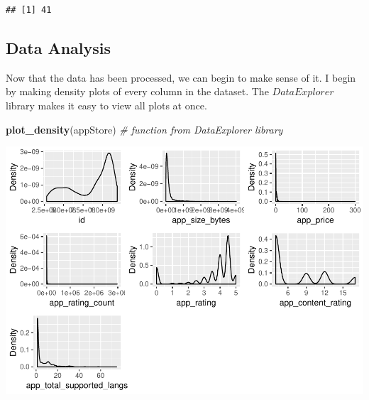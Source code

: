 \documentclass[]{article}
\newenvironment{Shaded}{\begin{snugshade}}{\end{snugshade}}
\newcommand{\CommentTok}[1]{\textcolor[rgb]{0.56,0.35,0.01}{\textit{#1}}}
\newcommand{\DecValTok}[1]{\textcolor[rgb]{0.00,0.00,0.81}{#1}}
\newcommand{\KeywordTok}[1]{\textcolor[rgb]{0.13,0.29,0.53}{\textbf{#1}}}
\newcommand{\NormalTok}[1]{#1}
\newcommand{\OperatorTok}[1]{\textcolor[rgb]{0.81,0.36,0.00}{\textbf{#1}}}
\newcommand{\OtherTok}[1]{\textcolor[rgb]{0.56,0.35,0.01}{#1}}
\newcommand{\StringTok}[1]{\textcolor[rgb]{0.31,0.60,0.02}{#1}}
\begin{document}
\begin{Shaded}
\end{Shaded}

\begin{verbatim}
## [1] 41
\end{verbatim}

\begin{Shaded}
\end{Shaded}

\hypertarget{data-analysis}{%
\subsection{Data Analysis}\label{data-analysis}}

Now that the data has been processed, we can begin to make sense of it.
I begin by making density plots of every column in the dataset. The
\(\textit{DataExplorer}\) library makes it easy to view all plots at
once.

\begin{Shaded}
\begin{Highlighting}[]
\KeywordTok{plot_density}\NormalTok{(appStore) }\CommentTok{# function from DataExplorer library}
\end{Highlighting}
\end{Shaded}

\includegraphics{xtern_ds_report_files/figure-latex/analysis1-1.pdf}
\end{document}
